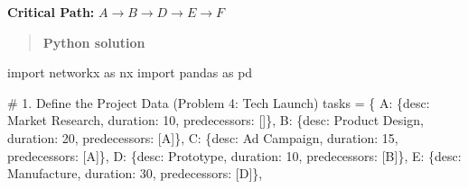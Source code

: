 \documentclass[
  letterpaper,
  DIV=11,
  numbers=noendperiod]{scrreprt}
\newenvironment{Shaded}{\begin{snugshade}}{\end{snugshade}}
\newcommand{\CommentTok}[1]{\textcolor[rgb]{0.37,0.37,0.37}{#1}}
\newcommand{\DecValTok}[1]{\textcolor[rgb]{0.68,0.00,0.00}{#1}}
\newcommand{\ImportTok}[1]{\textcolor[rgb]{0.00,0.46,0.62}{#1}}
\newcommand{\NormalTok}[1]{\textcolor[rgb]{0.00,0.23,0.31}{#1}}
\newcommand{\OperatorTok}[1]{\textcolor[rgb]{0.37,0.37,0.37}{#1}}
\newcommand{\StringTok}[1]{\textcolor[rgb]{0.13,0.47,0.30}{#1}}
\begin{document}
\textbf{Critical Path:} \(A \to B \to D \to E \to F\)

\begin{quote}
\textbf{Python solution}
\end{quote}

\begin{Shaded}
\begin{Highlighting}[]
\ImportTok{import}\NormalTok{ networkx }\ImportTok{as}\NormalTok{ nx}
\ImportTok{import}\NormalTok{ pandas }\ImportTok{as}\NormalTok{ pd}

\CommentTok{\# 1. Define the Project Data (Problem 4: Tech Launch)}
\NormalTok{tasks }\OperatorTok{=}\NormalTok{ \{}
    \StringTok{\textquotesingle{}A\textquotesingle{}}\NormalTok{: \{}\StringTok{\textquotesingle{}desc\textquotesingle{}}\NormalTok{: }\StringTok{\textquotesingle{}Market Research\textquotesingle{}}\NormalTok{, }\StringTok{\textquotesingle{}duration\textquotesingle{}}\NormalTok{: }\DecValTok{10}\NormalTok{, }\StringTok{\textquotesingle{}predecessors\textquotesingle{}}\NormalTok{: []\},}
    \StringTok{\textquotesingle{}B\textquotesingle{}}\NormalTok{: \{}\StringTok{\textquotesingle{}desc\textquotesingle{}}\NormalTok{: }\StringTok{\textquotesingle{}Product Design\textquotesingle{}}\NormalTok{,  }\StringTok{\textquotesingle{}duration\textquotesingle{}}\NormalTok{: }\DecValTok{20}\NormalTok{, }\StringTok{\textquotesingle{}predecessors\textquotesingle{}}\NormalTok{: [}\StringTok{\textquotesingle{}A\textquotesingle{}}\NormalTok{]\},}
    \StringTok{\textquotesingle{}C\textquotesingle{}}\NormalTok{: \{}\StringTok{\textquotesingle{}desc\textquotesingle{}}\NormalTok{: }\StringTok{\textquotesingle{}Ad Campaign\textquotesingle{}}\NormalTok{,     }\StringTok{\textquotesingle{}duration\textquotesingle{}}\NormalTok{: }\DecValTok{15}\NormalTok{, }\StringTok{\textquotesingle{}predecessors\textquotesingle{}}\NormalTok{: [}\StringTok{\textquotesingle{}A\textquotesingle{}}\NormalTok{]\},}
    \StringTok{\textquotesingle{}D\textquotesingle{}}\NormalTok{: \{}\StringTok{\textquotesingle{}desc\textquotesingle{}}\NormalTok{: }\StringTok{\textquotesingle{}Prototype\textquotesingle{}}\NormalTok{,       }\StringTok{\textquotesingle{}duration\textquotesingle{}}\NormalTok{: }\DecValTok{10}\NormalTok{, }\StringTok{\textquotesingle{}predecessors\textquotesingle{}}\NormalTok{: [}\StringTok{\textquotesingle{}B\textquotesingle{}}\NormalTok{]\},}
    \StringTok{\textquotesingle{}E\textquotesingle{}}\NormalTok{: \{}\StringTok{\textquotesingle{}desc\textquotesingle{}}\NormalTok{: }\StringTok{\textquotesingle{}Manufacture\textquotesingle{}}\NormalTok{,     }\StringTok{\textquotesingle{}duration\textquotesingle{}}\NormalTok{: }\DecValTok{30}\NormalTok{, }\StringTok{\textquotesingle{}predecessors\textquotesingle{}}\NormalTok{: [}\StringTok{\textquotesingle{}D\textquotesingle{}}\NormalTok{]\},}

\end{Highlighting}
\end{Shaded}
\end{document}
